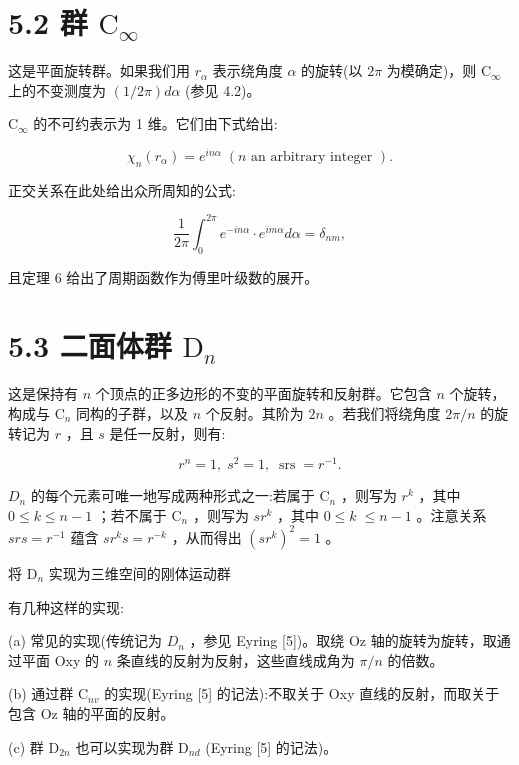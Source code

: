 \documentclass[10pt]{article}
\begin{document}
\section*{5.2 群 \({\mathrm{C}}_{\infty }\)}

这是平面旋转群。如果我们用 \({r}_{\alpha }\) 表示绕角度 \(\alpha\) 的旋转(以 \({2\pi }\) 为模确定)，则 \({\mathrm{C}}_{\infty }\) 上的不变测度为 \(\left( {1/{2\pi }}\right) {d\alpha }\) (参见 4.2)。

\({\mathrm{C}}_{\infty }\) 的不可约表示为 1 维。它们由下式给出:

\[
{\chi }_{n}\left( {r}_{\alpha }\right)  = {e}^{in\alpha }\;\left( {n\text{ an arbitrary integer }}\right) .
\]

正交关系在此处给出众所周知的公式:

\[
\frac{1}{2\pi }{\int }_{0}^{2\pi }{e}^{-{in\alpha }} \cdot  {e}^{im\alpha }{d\alpha } = {\delta }_{nm},
\]

且定理 6 给出了周期函数作为傅里叶级数的展开。

\section*{5.3 二面体群 \({\mathrm{D}}_{n}\)}

这是保持有 \(n\) 个顶点的正多边形的不变的平面旋转和反射群。它包含 \(n\) 个旋转，构成与 \({\mathrm{C}}_{n}\) 同构的子群，以及 \(n\) 个反射。其阶为 \({2n}\) 。若我们将绕角度 \({2\pi }/n\) 的旋转记为 \(r\) ，且 \(s\) 是任一反射，则有:

\[
{r}^{n} = 1,\;{s}^{2} = 1,\;\operatorname{srs} = {r}^{-1}.
\]

\({D}_{n}\) 的每个元素可唯一地写成两种形式之一:若属于 \({\mathrm{C}}_{n}\) ，则写为 \({r}^{k}\) ，其中 \(0 \leq  k \leq  n - 1\) ；若不属于 \({\mathrm{C}}_{n}\) ，则写为 \(s{r}^{k}\) ，其中 \(0 \leq  k \; \leq  n - 1\) 。注意关系 \({srs} = {r}^{-1}\) 蕴含 \(s{r}^{k}s = {r}^{-k}\) ，从而得出 \({\left( s{r}^{k}\right) }^{2} = 1\) 。

将 \({\mathrm{D}}_{n}\) 实现为三维空间的刚体运动群

有几种这样的实现:

(a) 常见的实现(传统记为 \({D}_{n}\) ，参见 Eyring [5])。取绕 Oz 轴的旋转为旋转，取通过平面 Oxy 的 \(n\) 条直线的反射为反射，这些直线成角为 \(\pi /n\) 的倍数。

(b) 通过群 \({\mathrm{C}}_{nv}\) 的实现(Eyring [5] 的记法):不取关于 Oxy 直线的反射，而取关于包含 Oz 轴的平面的反射。

(c) 群 \({\mathrm{D}}_{2n}\) 也可以实现为群 \({\mathrm{D}}_{nd}\) (Eyring [5] 的记法)。
\end{document}
